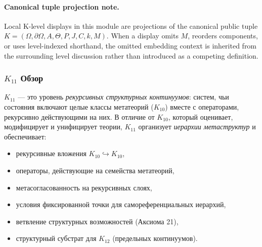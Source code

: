 



\paragraph{Canonical tuple projection note.}
Local K-level displays in this module are projections of the canonical public tuple \(K=(\Omega,\partial\Omega,A,\Theta,P,J,C,k,M)\). When a display omits \(M\), reorders components, or uses level-indexed shorthand, the omitted embedding context is inherited from the surrounding level discussion rather than introduced as a competing definition.

\subsubsection{$K_{11}$ Обзор}
\label{sec:k11-overview}

$K_{11}$ — это уровень \emph{рекурсивных структурных континуумов}: систем, чьи
состояния включают целые классы метатеорий ($K_{10}$) вместе с
операторами, рекурсивно действующими на них. В отличие от $K_{10}$, который оценивает,
модифицирует и унифицирует теории, $K_{11}$ организует \emph{иерархии
метаструктур} и обеспечивает:
\begin{itemize}
    \item рекурсивные вложения $K_{10}\hookrightarrow K_{10}$,
    \item операторы, действующие на семейства метатеорий,
    \item метасогласованность на рекурсивных слоях,
    \item условия фиксированной точки для самореференциальных иерархий,
    \item ветвление структурных возможностей (Аксиома 21),
    \item структурный субстрат для $K_{12}$ (предельных континуумов).
\end{itemize}

